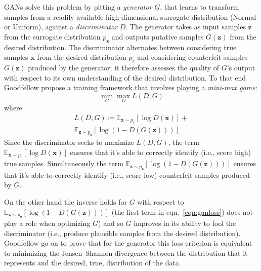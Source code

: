 GANs solve this problem by pitting a \textit{generator} \(G\), that learns to transform samples from a readily available high-dimensional surrogate distribution (Normal or Uniform), against a \textit{discriminator} \(D\).
The generator takes as input samples \(\bm{z}\) from the surrogate distribution \(p_{\bm{z}}\) and outputs putative samples \(G(\bm{z})\) from the desired distribution.
%
The discriminator alternates between considering true samples \(\bm{x}\) from the desired distribution \(p_r\) and considering counterfeit samples \(G(\bm{z})\) produced by the generator; it therefore assesses the quality of \(G\)'s output with respect to its own understanding of the desired distribution.
%
To that end Goodfellow \etal\cite{goodfellow2014generative} propose a training framework that involves playing a \textit{mini-max game}:
\begin{equation}
    \min_G \max_D L(D, G)
\end{equation}
where
\begin{multline}
    L(D, G) \coloneqq \mathbb{E}_{\bm{x} \sim p_{r}} [\log D(\bm{x})] + \\ \mathbb{E}_{\bm{z} \sim p_{\bm{z}} } [\log(1 - D(G(\bm{z})))]
    \label{eqn:ganloss}
\end{multline}
Since the discriminator seeks to maximize \(L(D, G)\), the term \(\mathbb{E}_{\bm{x} \sim p_{r}} [\log D(\bm{x})]\) ensures that it's able to correctly identify (i.e., score high) true samples.
%
Simultaneously the term \(\mathbb{E}_{\bm{z} \sim p_{\bm{z}} } [\log(1 - D(G(\bm{z})))] \) ensures that it's able to correctly identify (i.e., score low) counterfeit samples produced by \(G\).
%

On the other hand the inverse holds for \(G\) with respect to \(\mathbb{E}_{\bm{z} \sim p_{\bm{z}} } [\log(1 - D(G(\bm{z})))]\) (the first term in eqn.~\eqref{eqn:ganloss}) does not play a role when optimizing \(G\)) and so \(G\) improves in its ability to fool the discriminator (i.e., produce plausible samples from the desired distribution).
%
Goodfellow \etal go on to prove that for the generator this loss criterion is equivalent to minimizing the Jensen–Shannon divergence between the distribution that it represents and the desired, true, distribution of the data.

